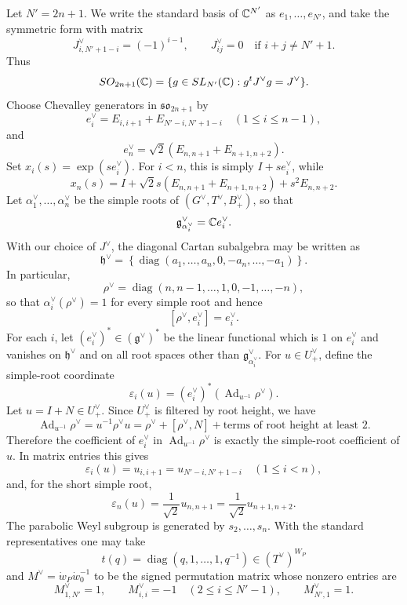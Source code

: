 Let \(N'=2n+1\). We write the standard basis of \(\mathbb{C}^{N'}\) as \(e_1,\ldots,e_{N'}\), and take the symmetric form with matrix
\[
J^\vee_{i,N'+1-i}=(-1)^{i-1},
\qquad
J^\vee_{ij}=0\quad\text{if }i+j\ne N'+1.
\]
Thus
\[
SO_{2n+1}(\mathbb{C})=\{g\in SL_{N'}(\mathbb{C}):g^tJ^\vee g=J^\vee\}.
\]
Choose Chevalley generators in \(\mathfrak{so}_{2n+1}\) by
\[
e_i^\vee=E_{i,i+1}+E_{N'-i,N'+1-i}
\quad(1\le i\le n-1),
\]
and
\[
e_n^\vee=\sqrt2(E_{n,n+1}+E_{n+1,n+2}).
\]
Set \(x_i(s)=\exp(se_i^\vee)\). For \(i<n\), this is simply \(I+se_i^\vee\), while
\[
x_n(s)=I+\sqrt2s(E_{n,n+1}+E_{n+1,n+2})+s^2E_{n,n+2}.
\]
Let \(\alpha_1^\vee,\ldots,\alpha_n^\vee\) be the simple roots of \((G^\vee,T^\vee,B_+^\vee)\), so that
\[
\mathfrak g^\vee_{\alpha_i^\vee}=\mathbb{C} e_i^\vee .
\]
With our choice of \(J^\vee\), the diagonal Cartan subalgebra may be written as
\[
\mathfrak h^\vee
=
\left\{
\operatorname{diag}(a_1,\ldots,a_n,0,-a_n,\ldots,-a_1)
\right\}.
\]
In particular,
\[
\rho^\vee
=
\operatorname{diag}(n,n-1,\ldots,1,0,-1,\ldots,-n),
\]
so that \(\alpha_i^\vee(\rho^\vee)=1\) for every simple root and hence
\[
[\rho^\vee,e_i^\vee]=e_i^\vee .
\]
For each \(i\), let \((e_i^\vee)^*\in(\mathfrak g^\vee)^*\) be the linear functional which is \(1\) on \(e_i^\vee\) and vanishes on \(\mathfrak h^\vee\) and on all root spaces other than \(\mathfrak g^\vee_{\alpha_i^\vee}\). For \(u\in U_+^\vee\), define the simple-root coordinate
\[
\varepsilon_i(u)=(e_i^\vee)^*(\operatorname{Ad}_{u^{-1}}\rho^\vee).
\]
Let \(u=I+N\in U_+^\vee\). Since \(U_+^\vee\) is filtered by root height, we have
\[
\operatorname{Ad}_{u^{-1}}\rho^\vee
=
u^{-1}\rho^\vee u
=
\rho^\vee+[\rho^\vee,N]+\text{terms of root height at least }2.
\]
Therefore the coefficient of \(e_i^\vee\) in \(\operatorname{Ad}_{u^{-1}}\rho^\vee\) is exactly the simple-root coefficient of \(u\). In matrix entries this gives
\[
\varepsilon_i(u)=u_{i,i+1}=u_{N'-i,N'+1-i}\quad(1\le i<n),
\]
and, for the short simple root,
\[
\varepsilon_n(u)=\frac{1}{\sqrt2}u_{n,n+1}
=
\frac{1}{\sqrt2}u_{n+1,n+2}.
\]
The parabolic Weyl subgroup is generated by \(s_2,\ldots,s_n\). With the standard representatives one may take
\[
t(q)=\operatorname{diag}(q,1,\ldots,1,q^{-1})\in (T^\vee)^{W_P}
\]
and \(M^\vee=\dot w_P\dot w_0^{-1}\) to be the signed permutation matrix whose nonzero entries are
\[
M^\vee_{1,N'}=1,
\qquad
M^\vee_{i,i}=-1\quad(2\le i\le N'-1),
\qquad
M^\vee_{N',1}=1.
\]

